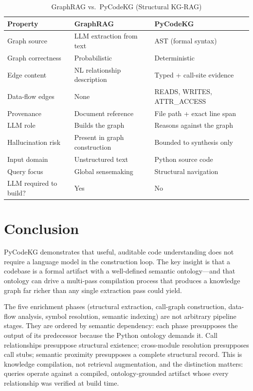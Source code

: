 \documentclass[10pt]{article}
\begin{document}
\begin{table}[h]
\centering
\caption{GraphRAG vs.\ PyCodeKG (Structural KG-RAG)}
\label{tab:comparison}
\begin{tabular}{lll}
\toprule
Property & GraphRAG~\cite{edge2024graphrag} & PyCodeKG \\
\midrule
Graph source        & LLM extraction from text     & AST (formal syntax)         \\
Graph correctness   & Probabilistic                & Deterministic                \\
Edge content        & NL relationship description  & Typed + call-site evidence   \\
Data-flow edges     & None                         & READS, WRITES, ATTR\_ACCESS  \\
Provenance          & Document reference           & File path + exact line span  \\
LLM role            & Builds the graph             & Reasons against the graph    \\
Hallucination risk  & Present in graph construction & Bounded to synthesis only   \\
Input domain        & Unstructured text            & Python source code           \\
Query focus         & Global sensemaking           & Structural navigation        \\
LLM required to build? & Yes                      & No                          \\
\bottomrule
\end{tabular}
\end{table}

\section{Conclusion}

PyCodeKG demonstrates that useful, auditable code understanding does not require a
language model in the construction loop. The key insight is that a codebase is a
formal artifact with a well-defined semantic ontology---and that ontology can drive
a multi-pass compilation process that produces a knowledge graph far richer than
any single extraction pass could yield.

The five enrichment phases (structural extraction, call-graph construction,
data-flow analysis, symbol resolution, semantic indexing) are not arbitrary
pipeline stages. They are ordered by semantic dependency: each phase presupposes
the output of its predecessor because the Python ontology demands it. Call
relationships presuppose structural existence; cross-module resolution
presupposes call stubs; semantic proximity presupposes a complete structural
record. This is knowledge compilation, not retrieval augmentation, and the
distinction matters: queries operate against a compiled, ontology-grounded
artifact whose every relationship was verified at build time.
\end{document}
